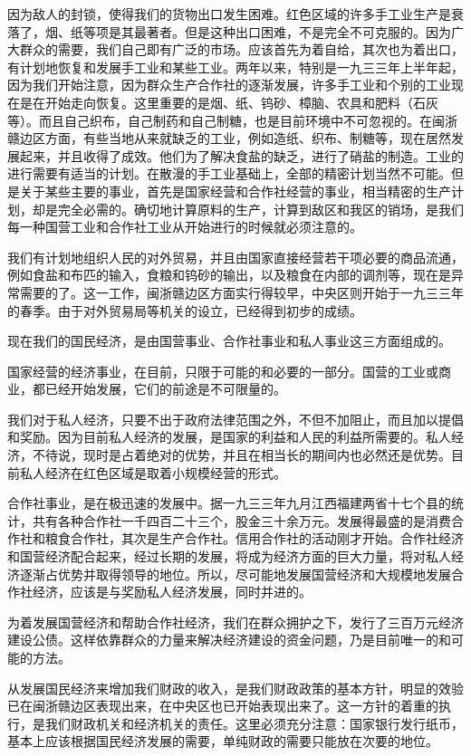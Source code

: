 因为敌人的封锁，使得我们的货物出口发生困难。红色区域的许多手工业生产是衰落了，烟、纸等项是其最著者。但是这种出口困难，不是完全不可克服的。因为广大群众的需要，我们自己即有广泛的市场。应该首先为着自给，其次也为着出口，有计划地恢复和发展手工业和某些工业。两年以来，特别是一九三三年上半年起，因为我们开始注意，因为群众生产合作社的逐渐发展，许多手工业和个别的工业现在是在开始走向恢复。这里重要的是烟、纸、钨砂、樟脑、农具和肥料（石灰等）。而且自己织布，自己制药和自己制糖，也是目前环境中不可忽视的。在闽浙赣边区方面，有些当地从来就缺乏的工业，例如造纸、织布、制糖等，现在居然发展起来，并且收得了成效。他们为了解决食盐的缺乏，进行了硝盐的制造。工业的进行需要有适当的计划。在散漫的手工业基础上，全部的精密计划当然不可能。但是关于某些主要的事业，首先是国家经营和合作社经营的事业，相当精密的生产计划，却是完全必需的。确切地计算原料的生产，计算到敌区和我区的销场，是我们每一种国营工业和合作社工业从开始进行的时候就必须注意的。

我们有计划地组织人民的对外贸易，并且由国家直接经营若干项必要的商品流通，例如食盐和布匹的输入，食粮和钨砂的输出，以及粮食在内部的调剂等，现在是异常需要的了。这一工作，闽浙赣边区方面实行得较早，中央区则开始于一九三三年的春季。由于对外贸易局等机关的设立，已经得到初步的成绩。

现在我们的国民经济，是由国营事业、合作社事业和私人事业这三方面组成的。

国家经营的经济事业，在目前，只限于可能的和必要的一部分。国营的工业或商业，都已经开始发展，它们的前途是不可限量的。

我们对于私人经济，只要不出于政府法律范围之外，不但不加阻止，而且加以提倡和奖励。因为目前私人经济的发展，是国家的利益和人民的利益所需要的。私人经济，不待说，现时是占着绝对的优势，并且在相当长的期间内也必然还是优势。目前私人经济在红色区域是取着小规模经营的形式。

合作社事业，是在极迅速的发展中。据一九三三年九月江西福建两省十七个县的统计，共有各种合作社一千四百二十三个，股金三十余万元。发展得最盛的是消费合作社和粮食合作社，其次是生产合作社。信用合作社的活动刚才开始。合作社经济和国营经济配合起来，经过长期的发展，将成为经济方面的巨大力量，将对私人经济逐渐占优势并取得领导的地位。所以，尽可能地发展国营经济和大规模地发展合作社经济，应该是与奖励私人经济发展，同时并进的。

为着发展国营经济和帮助合作社经济，我们在群众拥护之下，发行了三百万元经济建设公债。这样依靠群众的力量来解决经济建设的资金问题，乃是目前唯一的和可能的方法。

从发展国民经济来增加我们财政的收入，是我们财政政策的基本方针，明显的效验已在闽浙赣边区表现出来，在中央区也已开始表现出来了。这一方针的着重的执行，是我们财政机关和经济机关的责任。这里必须充分注意：国家银行发行纸币，基本上应该根据国民经济发展的需要，单纯财政的需要只能放在次要的地位。

